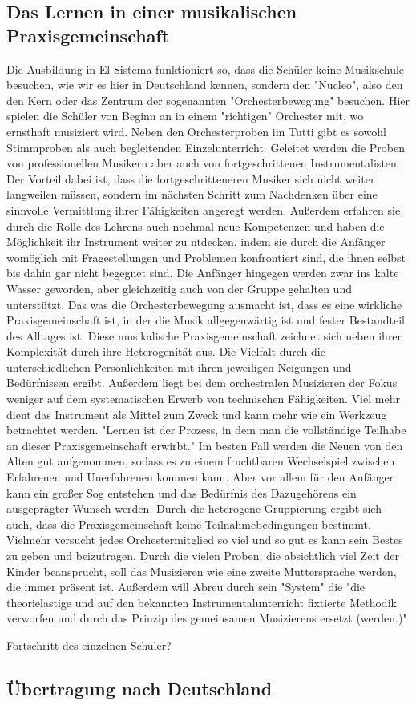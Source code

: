 \subsection{Das Lernen in einer musikalischen Praxisgemeinschaft}
Die Ausbildung in El Sistema funktioniert so, dass die Schüler keine Musikschule
besuchen, wie wir es hier in Deutschland kennen, sondern den "Nucleo", also den
den Kern oder das Zentrum der sogenannten "Orchesterbewegung" besuchen. Hier
spielen die Schüler von Beginn an in einem "richtigen" Orchester mit, wo
ernsthaft musiziert wird. Neben den Orchesterproben im Tutti gibt es sowohl
Stimmproben als auch begleitenden Einzelunterricht. Geleitet werden die Proben
von professionellen Musikern aber auch von fortgeschrittenen Instrumentalisten.
\autocite[45]{kaufmann:el_sistema} Der Vorteil dabei ist, dass die
fortgeschritteneren Musiker sich nicht weiter langweilen müssen, sondern im
nächsten Schritt zum Nachdenken über eine sinnvolle Vermittlung ihrer
Fähigkeiten angeregt werden. Außerdem erfahren sie durch die Rolle des Lehrens
auch nochmal neue Kompetenzen und haben die Möglichkeit ihr Instrument weiter zu
ntdecken, indem sie durch die Anfänger womöglich mit Fragestellungen und
Problemen konfrontiert sind, die ihnen selbst bis dahin gar nicht begegnet sind.
Die Anfänger hingegen werden zwar ins kalte Wasser
geworden, aber gleichzeitig auch von der Gruppe gehalten und unterstützt.
Das was die Orchesterbewegung ausmacht ist, dass es eine wirkliche
Praxisgemeinschaft ist, in der die Musik allgegenwärtig ist und fester
Bestandteil des Alltages ist. Diese musikalische Praxisgemeinschaft zeichnet
sich neben ihrer Komplexität durch ihre Heterogenität aus. Die Vielfalt durch
die unterschiedlichen Persönlichkeiten mit ihren jeweiligen Neigungen und
Bedürfnissen ergibt. %
Außerdem liegt bei dem orchestralen Musizieren der Fokus weniger auf dem
systematischen Erwerb von technischen Fähigkeiten. Viel mehr dient das
Instrument als Mittel zum Zweck und kann mehr wie ein Werkzeug betrachtet
werden. "Lernen ist der Prozess, in dem man die vollständige Teilhabe an dieser
Praxisgemeinschaft erwirbt." Im besten Fall werden die Neuen von den Alten gut
aufgenommen, sodass es zu einem fruchtbaren Wechselspiel zwischen Erfahrenen und
Unerfahrenen kommen kann. Aber vor allem für den Anfänger kann ein großer Sog
entstehen und das Bedürfnis des Dazugehörens ein ausgeprägter Wunsch werden.
Durch die heterogene Gruppierung ergibt sich auch, dass die Praxisgemeinschaft
keine Teilnahmebedingungen bestimmt. Vielmehr versucht jedes Orchestermitglied
so viel und so gut es kann sein Bestes zu geben und beizutragen. Durch die
vielen Proben, die absichtlich viel Zeit der Kinder beansprucht, soll das
Musizieren wie eine zweite Muttersprache werden, die immer präsent ist.%
Außerdem will Abreu durch sein "System" die "die theorielastige und auf den
bekannten Instrumentalunterricht fixtierte Methodik verworfen und durch das
Prinzip des gemeinsamen Musizierens ersetzt (werden.)" \autocite[45]{kaufmann:el_sistema}


Fortschritt des einzelnen Schüler?

\subsection{Übertragung nach Deutschland}

